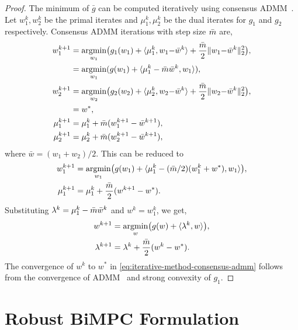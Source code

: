 \begin{proof}
The minimum of $\bar{g}$ can be computed iteratively using consensus ADMM~\cite[Sec.~7.1]{boyd2011distributed}.
Let $w_1^k, w^k_2$ be the primal iterates and $\mu_1^k, \mu^k_2$ be the dual iterates for $g_1$ and $g_2$ respectively.
Consensus ADMM iterations with step size $\bar{m}$ are,
\begin{align*}
    w_1^{k+1} & = \operatorname*{argmin}_{w_1} \bigl( g_1(w_1) + \langle \mu_1^k, w_1 {-} \bar{w}^k \rangle + \frac{\bar{m}}{2} \lVert w_1 {-} \bar{w}^k\rVert_2^2\bigr), \\
    & = \operatorname*{argmin}_{w_1} ( g(w_1) + \langle \mu^k_1 - \bar{m} \bar{w}^k, w_1 \rangle ), \\
    w_2^{k+1} & = \operatorname*{argmin}_{w_2} \bigl( g_2(w_2) + \langle \mu_2^k, w_2 {-} \bar{w}^k\rangle + \frac{\bar{m}}{2} \lVert w_2 {-} \bar{w}^k\rVert_2^2\bigr), \\
    & = w^*, \\
    \mu_1^{k+1} & = \mu_1^k + \bar{m} (w_1^{k+1} - \bar{w}^{k+1}), \\
    \mu_2^{k+1} & = \mu_2^k + \bar{m} (w_2^{k+1} - \bar{w}^{k+1}),
\end{align*}
where $\bar{w} = (w_1 + w_2)/2$.
This can be reduced to
\begin{align*}
    w_1^{k+1} & = \operatorname*{argmin}_{w_1} \bigl( g(w_1) + \langle \mu^k_1 - (\bar{m}/2) (w_1^k + w^*), w_1\rangle \bigr), \\
    \mu_1^{k+1} & = \mu_1^k + \frac{\bar{m}}{2} (w^{k+1} - w^*).
\end{align*}
Substituting $\lambda^k = \mu_1^k - \bar{m} \bar{w}^k$ and $w^k = w_1^k$, we get,
\begin{align*}
    w^{k+1} & = \operatorname*{argmin}_{w} \bigl( g(w) + \langle\lambda^k, w\rangle \bigr), \\
    \lambda^{k+1} & = \lambda^k + \frac{\bar{m}}{2} (w^{k} - w^*).
\end{align*}
The convergence of $w^k$ to $w^*$ in \eqref{eq:iterative-method-consensus-admm} follows from the convergence of ADMM~\cite[Sec.~3.2.1]{boyd2011distributed} and strong convexity of $g_1$.
\end{proof}

\fi

\section{Robust BiMPC Formulation}
\label{app:robust-bimpc-formulation}

